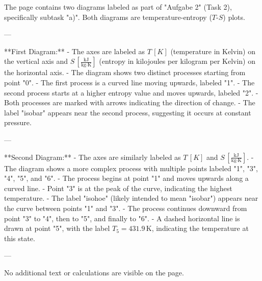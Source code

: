 The page contains two diagrams labeled as part of "Aufgabe 2" (Task 2), specifically subtask "a)". Both diagrams are temperature-entropy (\( T \)-\( S \)) plots.

---

**First Diagram:**  
- The axes are labeled as \( T \, [K] \) (temperature in Kelvin) on the vertical axis and \( S \, [\frac{\text{kJ}}{\text{kg·K}}] \) (entropy in kilojoules per kilogram per Kelvin) on the horizontal axis.  
- The diagram shows two distinct processes starting from point "0".  
- The first process is a curved line moving upwards, labeled "1".  
- The second process starts at a higher entropy value and moves upwards, labeled "2".  
- Both processes are marked with arrows indicating the direction of change.  
- The label "isobar" appears near the second process, suggesting it occurs at constant pressure.

---

**Second Diagram:**  
- The axes are similarly labeled as \( T \, [K] \) and \( S \, [\frac{\text{kJ}}{\text{kg·K}}] \).  
- The diagram shows a more complex process with multiple points labeled "1", "3", "4", "5", and "6".  
- The process begins at point "1" and moves upwards along a curved line.  
- Point "3" is at the peak of the curve, indicating the highest temperature.  
- The label "isohoe" (likely intended to mean "isobar") appears near the curve between points "1" and "3".  
- The process continues downward from point "3" to "4", then to "5", and finally to "6".  
- A dashed horizontal line is drawn at point "5", with the label \( T_5 = 431.9 \, \text{K} \), indicating the temperature at this state.

---

No additional text or calculations are visible on the page.
